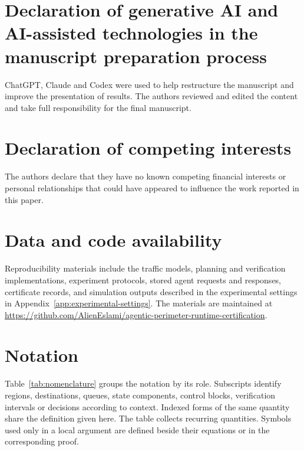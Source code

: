 \documentclass[final]{cas-sc}
\theoremstyle{definition}
\theoremstyle{plain}
\theoremstyle{definition}
\theoremstyle{plain}
\newcommand{\appref}[1]{Appendix~\ref{#1}}
\begin{document}
\section*{Declaration of generative AI and AI-assisted technologies in the manuscript preparation process}
ChatGPT, Claude and Codex were used to help restructure the manuscript
and improve the presentation of results. The authors reviewed and
edited the content and take full responsibility for the final manuscript.

\section*{Declaration of competing interests}
The authors declare that they have no known competing financial interests or
personal relationships that could have appeared to influence the work
reported in this paper.

\section*{Data and code availability}
Reproducibility materials include the traffic models, planning and
verification implementations, experiment protocols, stored agent requests
and responses, certificate records, and simulation outputs described in the
experimental settings in \appref{app:experimental-settings}. The materials are maintained at
\url{https://github.com/AlienEslami/agentic-perimeter-runtime-certification}.


\appendix
\renewcommand{\theequation}{\Alph{section}.\arabic{equation}}
\renewcommand{\thetable}{\Alph{section}.\arabic{table}}
\renewcommand{\thefigure}{\Alph{section}.\arabic{figure}}
\section{Notation}
\label{app:notation}

Table~\ref{tab:nomenclature} groups the notation by its role. Subscripts
identify regions, destinations, queues, state components, control blocks,
verification intervals or decisions according to context. Indexed forms
of the same quantity share the definition given here. The table collects recurring quantities. Symbols used only in a local
argument are defined beside their equations or in the corresponding proof.
\end{document}

